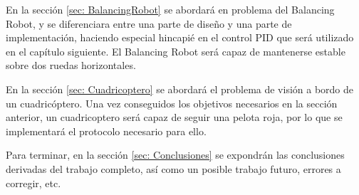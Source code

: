 En la sección \ref{sec: BalancingRobot} se abordará en problema del Balancing Robot, y se diferenciara entre una parte de diseño y una parte de implementación, haciendo especial hincapié en el control PID que será utilizado en el capítulo siguiente. El Balancing Robot será capaz de mantenerse estable sobre dos ruedas horizontales.\newline

En la sección \ref{sec: Cuadricoptero} se abordará el problema de visión a bordo de un cuadricóptero. 
Una vez conseguidos los objetivos necesarios en la sección anterior, un cuadricoptero será capaz de seguir una pelota roja, por lo que se implementará el protocolo necesario para ello. \newline

Para terminar, en la sección \ref{sec: Conclusiones} se expondrán las conclusiones derivadas del trabajo completo, así como un posible trabajo futuro, errores a corregir, etc.   